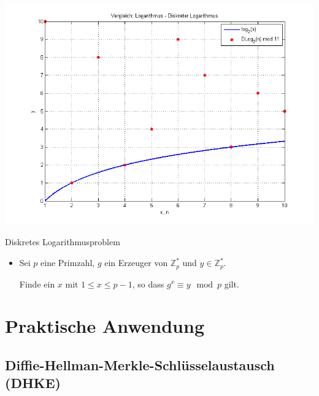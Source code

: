 \documentclass[utf8]{beamer}
\newcommand{\Z}{\mathbb{Z}}
\begin{document}
\begin{frame}{\insertsubsectionhead}
  \begin{center}
    \includegraphics[width=\textwidth]{log_discLog.png}
  \end{center}
\end{frame}

\begin{frame}{Diskretes Logarithmusproblem}
  \begin{itemize}
    \item Sei $p$ eine Primzahl, $g$ ein Erzeuger von $\Z_p^*$ und $y \in
      \Z_p^*$.

      Finde ein $x$ mit $1 \leq x \leq p-1$, so dass $g^x \equiv y \mod
      p$ gilt.
  \end{itemize}
\end{frame}

\section{Praktische Anwendung}
\label{sec:praktische_anwendung}

\subsection{Diffie-Hellman-Merkle-Schlüsselaustausch (DHKE)}
\label{sub:diffie_hellman_merkle_schlusselaustausch}
\end{document}
